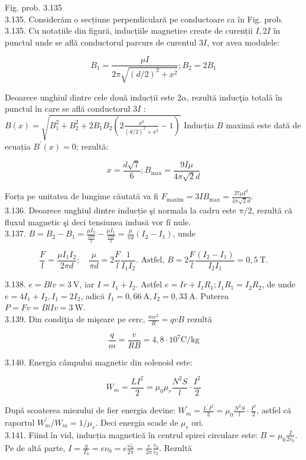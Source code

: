 \documentclass[10pt]{article}
\begin{document}
Fig. prob. 3.135\\
3.135. Considerăm o secțiune perpendiculară pe conductoare ca în Fig. prob. 3.135. Cu notațiile din figură, inducțiile magnetice create de curenții $I, 2 I$ în punctul unde se află conductorul parcurs de curentul $3 I$, vor avea modulele:

$$
B_{1}=\frac{\mu I}{2 \pi \sqrt{(d / 2)^{2}+x^{2}}} ; B_{2}=2 B_{1}
$$

Deoarece unghiul dintre cele două inducții este $2 \alpha$, rezultă inducţia totală în punctul în care se află conductorul $3 I$ :\\
$B(x)=\sqrt{B_{1}^{2}+B_{2}^{2}+2 B_{1} B_{2}\left(2 \frac{x^{2}}{(d / 2)^{2}+x^{2}}-1\right)}$ Inducția $B$ maximă este dată de ecuația $B^{\prime}(x)=0$; rezultă:

$$
x=\frac{d \sqrt{7}}{6} ; B_{\max }=\frac{9 I \mu}{4 \pi \sqrt{2} d}
$$

Forța pe unitatea de lungime căutată va fi $F_{\operatorname{maxim}}=3 I B_{\max }=\frac{27 \mu I^{2}}{4 \pi \sqrt{2} d}$.\\
3.136. Deoarece unghiul dintre inducție şi normala la cadru este $\pi / 2$, rezultă că fluxul magnetic şi deci tensiunea indusă vor fí nule.\\
3.137. $B=B_{2}-B_{1}=\frac{\mu I_{2}}{\frac{2 \pi d}{2}}-\frac{\mu I_{1}}{\frac{2 \pi d}{2}}=\frac{\mu}{\pi d}\left(I_{2}-I_{1}\right)$, unde

$$
\frac{F}{l}=\frac{\mu I_{1} I_{2}}{2 \pi d} ; \quad \frac{\mu}{\pi d}=2 \frac{F}{l} \frac{1}{I_{1} I_{2}} . \text { Astfel, } B=2 \frac{F}{l} \frac{\left(I_{2}-I_{1}\right)}{I_{2} I_{1}}=0,5 \mathrm{~T} .
$$

3.138. $e=B l v=3 \mathrm{~V}$, iar $I=I_{1}+I_{2}$. Astfel $e=I r+I_{1} R_{1} ; I_{1} R_{1}=I_{2} R_{2}$, de unde $e=4 I_{1}+I_{2}, I_{1}=2 I_{2}$, adică $I_{1}=0,66 \mathrm{~A}, I_{2}=0,33 \mathrm{~A}$. Puterea $P=F v=B l I v=3 \mathrm{~W}$.\\
3.139. Din condiţia de mişeare pe cerc, $\frac{m v^{2}}{R}=q v B$ rezultã

$$
\frac{q}{m}=\frac{v}{R B}=4,8 \cdot 10^{7} \mathrm{C} / \mathrm{kg}
$$

3.140. Energia câmpului magnetic din solenoid este:

$$
W_{m}=\frac{L I^{2}}{2}=\mu_{0} \mu_{r} \frac{N^{2} S}{l} \cdot \frac{I^{2}}{2}
$$

După scoaterea miezului de fier energia devine: $W_{m}^{\prime}=\frac{L^{\prime} I^{2}}{2}=\mu_{0} \frac{N^{2} S}{l} \cdot \frac{I^{2}}{2}$, astfel că raportul $W_{m}^{\prime} / W_{m}=1 / \mu_{r}$. Deci energia scade de $\mu_{r}$ ori.\\
3.141. Fiind în vid, inducția magnetică în centrul spirei circulare este: $B=\mu_{0} \frac{I}{2 r_{0}}$. Pe de altǎ parte, $I=\frac{q}{T_{0}}=e \nu_{0}=e \frac{\omega_{0}}{2 \pi}=\frac{e}{2 \pi} \frac{v_{0}}{r_{0}}$. Rezultă
\end{document}
